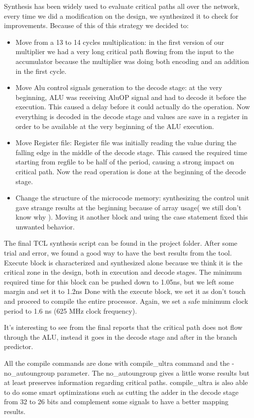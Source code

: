 \documentclass[12pt]{article}
\begin{document}
Synthesis has been widely used to evaluate critical paths all over the network, every time we did a modification on the design, we synthesized it to check for improvements. 
Because of this of this strategy we decided to:
\begin{itemize}
	\item Move from a 13 to 14 cycles multiplication: in the first version of our multiplier we had a very long critical path flowing from the input to the accumulator because the multiplier was doing both encoding and an addition in the first cycle.
	\item Move Alu control signals generation to the decode stage: at the very beginning, ALU was receiving AluOP signal and had to decode it before the execution. This caused a delay before it could actually do the operation. Now everything is decoded in the decode stage and values are save in a register in order to be available at the very beginning of the ALU execution.
	\item Move Register file: Register file was initially reading the value during the falling edge in the middle of the decode stage. This caused the required time starting from regfile to be half of the period, causing a strong impact on critical path. Now the read operation is done at the beginning of the decode stage.
	\item Change the structure of the microcode memory: synthesizing the control unit gave strange results at the beginning because of array usage( we still don't know why ). Moving it another block and using the case statement fixed this unwanted behavior. 
\end{itemize}

The final TCL synthesis script can be found in the project folder. After some trial and error, we found a good way to have the best results from the tool.
Execute block is characterized and synthesized alone because we think it is the critical zone in the design, both in execution and decode stages. 
The minimum required time for this block can be pushed down to 1.05ns, but we left some margin and set it to 1.2ns
Done with the execute block, we set it as don't touch and proceed to compile the entire processor.
Again, we set a safe minimum clock period to 1.6 ns (625 MHz clock frequency).

It's interesting to see from the final reports that the critical path does not flow through the ALU, instead it goes in the decode stage and after in the branch predictor.

All the compile commands are done with compile\_ultra command and the -no\_autoungroup parameter. The no\_autoungroup gives a little worse results but at least preserves information regarding critical paths.
compile\_ultra is also able to do some smart optimizations such as cutting the adder in the decode stage from 32 to 26 bits and complement some signals to have a better mapping results.
\end{document}
